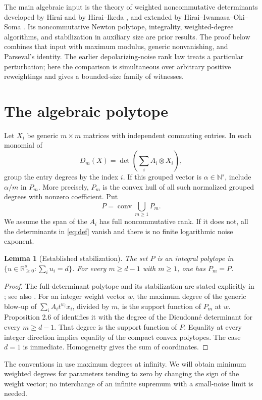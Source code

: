 \documentclass[11pt]{article}
\newtheorem{lemma}[theorem]{Lemma}
\newcommand{\conv}{\operatorname{conv}}
\newcommand{\R}{\mathbb R}
\newcommand{\N}{\mathbb N}
\begin{document}
The main algebraic input is the theory of weighted noncommutative determinants developed by Hirai and by Hirai--Ikeda \cite{hi}, and extended by Hirai--Iwamasa--Oki--Soma \cite{hios}. Its noncommutative Newton polytope, integrality, weighted-degree algorithms, and stabilization in auxiliary size are prior results. The proof below combines that input with maximum modulus, generic nonvanishing, and Parseval's identity. The earlier depolarizing-noise rank law \cite{sharp} treats a particular perturbation; here the comparison is simultaneous over arbitrary positive reweightings and gives a bounded-size family of witnesses.

\section{The algebraic polytope}
Let $X_i$ be generic $m\times m$ matrices with independent commuting entries. In each monomial of
\[
 D_m(X)=\det\left(\sum_i A_i\otimes X_i\right),
\]
group the entry degrees by the index $i$. If this grouped vector is $\alpha\in\N^s$, include $\alpha/m$ in $P_m$. More precisely, $P_m$ is the convex hull of all such normalized grouped degrees with nonzero coefficient. Put
\[
 P=\conv\bigcup_{m\ge1}P_m.
\]
We assume the span of the $A_i$ has full noncommutative rank. If it does not, all the determinants in \eqref{eq:def} vanish and there is no finite logarithmic noise exponent.

\begin{lemma}[Established stabilization]\label{lem:algebra}
The set $P$ is an integral polytope in
$\{u\in\R_{\ge0}^s:\sum_i u_i=d\}$. For every
$m\ge d-1$ with $m\ge1$, one has $P_m=P$.
\end{lemma}
\begin{proof}
The full-determinant polytope and its stabilization are stated explicitly in \cite[Section 4.2, after Theorem 4.3; Theorem 4.4]{hi}; see also \cite[Theorem 3.12]{hios}. For an integer weight vector $w$, the maximum degree of the generic blow-up of $\sum_i A_i t^{w_i}x_i$, divided by $m$, is the support function of $P_m$ at $w$. Proposition 2.6 of \cite{hios} identifies it with the degree of the Dieudonn\'e determinant for every $m\ge d-1$. That degree is the support function of $P$. Equality at every integer direction implies equality of the compact convex polytopes. The case $d=1$ is immediate. Homogeneity gives the sum of coordinates.
\end{proof}
The conventions in \cite{hios} use maximum degrees at infinity. We will obtain minimum weighted degrees for parameters tending to zero by changing the sign of the weight vector; no interchange of an infinite supremum with a small-noise limit is needed.
\end{document}

